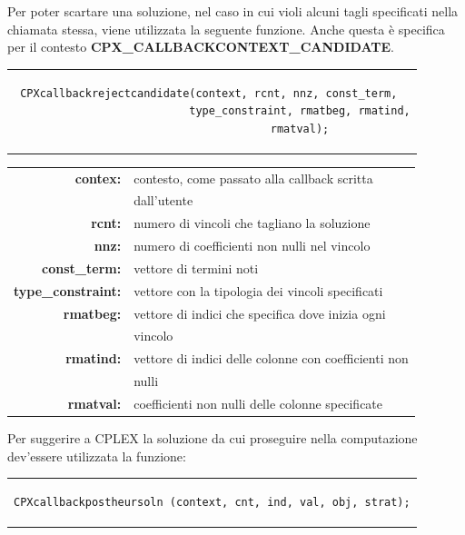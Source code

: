 Per poter scartare una soluzione, nel caso in cui violi alcuni tagli specificati nella chiamata stessa, viene utilizzata la seguente funzione. Anche questa è specifica per il contesto \textbf{CPX\_CALLBACKCONTEXT\_CANDIDATE}.
\begin{center}
\begin{tabular}{c}
\begin{lstlisting}[linewidth=365pt, basicstyle=\footnotesize\sffamily,]    
CPXcallbackrejectcandidate(context, rcnt, nnz, const_term, 
                           type_constraint, rmatbeg, rmatind,
                           rmatval);
\end{lstlisting}
\end{tabular}
\end{center}
\begin{table}[h]
\centering
\begin{tabular}{rl}
\textbf{contex:} & {contesto, come passato alla callback scritta}\\
&{dall'utente}\\
\textbf{rcnt:} & {numero di vincoli che tagliano la soluzione}\\
\textbf{nnz:} & {numero di coefficienti non nulli nel vincolo}\\
\textbf{const\_term:} & {vettore di termini noti}\\
\textbf{type\_constraint:} & {vettore con la tipologia dei vincoli specificati}\\
\textbf{rmatbeg:} & {vettore di indici che specifica dove inizia ogni}\\
&{vincolo}\\
\textbf{rmatind:} & {vettore di indici delle colonne con coefficienti non}\\
&{nulli}\\
\textbf{rmatval:} & {coefficienti non nulli delle colonne specificate}\\
\end{tabular}
\end{table}
Per suggerire a CPLEX la soluzione da cui proseguire nella computazione dev'essere utilizzata la funzione:
\begin{center}
\begin{tabular}{c}
\begin{lstlisting}[linewidth=365pt, basicstyle=\footnotesize\sffamily,]    
CPXcallbackpostheursoln (context, cnt, ind, val, obj, strat);
\end{lstlisting}
\end{tabular}
\end{center}
